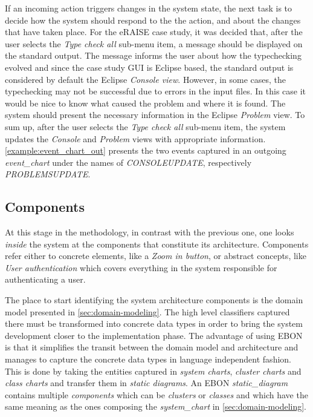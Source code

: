 \documentclass[conference]{IEEEtran}
\begin{document}


If an incoming action triggers changes in the system state, the next
task is to decide how the system should respond to the the action, and
about the changes that have taken place.  For the eRAISE case study,
it was decided that, after the user selects the \emph{Type check all}
sub-menu item, a message should be displayed on the standard output.
The message informs the user about how the typechecking evolved and
since the case study GUI is Eclipse based, the standard output is
considered by default the Eclipse \emph{Console view}.  However, in
some cases, the typechecking may not be successful due to errors in
the input files.  In this case it would be nice to know what caused
the problem and where it is found.  The system should present the
necessary information in the Eclipse \emph{Problem} view.  To sum up,
after the user selects the \emph{Type check all} sub-menu item, the
system updates the \emph{Console} and \emph{Problem} views with
appropriate information. \autoref{example:event_chart_out} presents
the two events captured in an outgoing \emph{event\_chart} under the
names of \emph{CONSOLEUPDATE}, respectively \emph{PROBLEMSUPDATE}.

%
\subsection{Components}
\label{sec:components}

At this stage in the methodology, in contrast with the previous one,
one looks \emph{inside} the system at the components that constitute
its architecture.  Components refer either to concrete elements, like a
\emph{Zoom in button}, or abstract concepts, like \emph{User
  authentication} which covers everything in the system responsible
for authenticating a user.

The place to start identifying the system architecture components is
the domain model presented in \autoref{sec:domain-modeling}. The high
level classifiers captured there must be transformed into concrete
data types in order to bring the system development closer to the
implementation phase. The advantage of using EBON is that it
simplifies the transit between the domain model and architecture
and manages to capture the concrete data types in language
independent fashion. This is done by taking the entities captured in
\emph{system charts}, \emph{cluster charts} and \emph{class charts} and
transfer them in \emph{static diagrams}. An EBON \emph{static\_diagram}
contains multiple \emph{components} which can be \emph{clusters} or
\emph{classes} and which have the same meaning as the ones composing the
\emph{system\_chart} in \autoref{sec:domain-modeling}.
\end{document}
